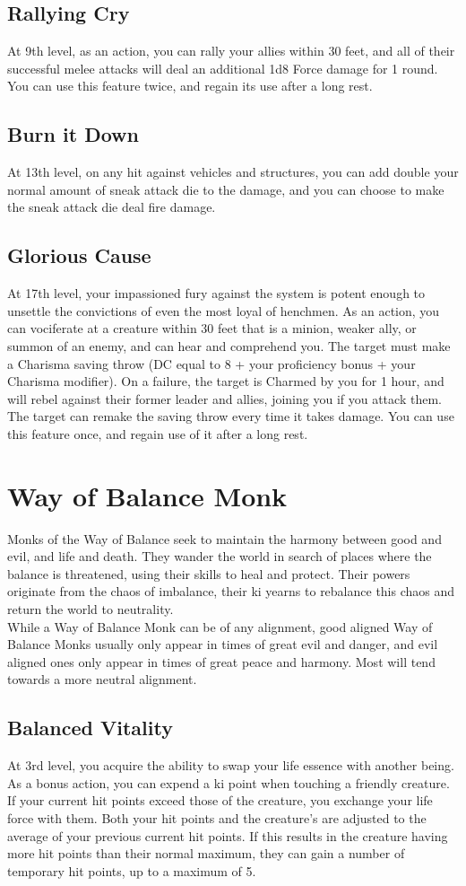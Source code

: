 \subsection{Rallying Cry}
At 9th level, as an action, you can rally your allies within 30 feet, and all of their successful melee attacks will deal an additional 1d8 Force damage for 1 round. You can use this feature twice, and regain its use after a long rest.
\subsection{Burn it Down}
At 13th level, on any hit against vehicles and structures, you can add double your normal amount of sneak attack die to the damage, and you can choose to make the sneak attack die deal fire damage. 
\subsection{Glorious Cause}
At 17th level, your impassioned fury against the system is potent enough to unsettle the convictions of even the most loyal of henchmen. As an action, you can vociferate at a creature within 30 feet that is a minion, weaker ally, or summon of an enemy, and can hear and comprehend you. The target must make a Charisma saving throw (DC equal to 8 + your proficiency bonus + your Charisma modifier). On a failure, the target is Charmed by you for 1 hour, and will rebel against their former leader and allies, joining you if you attack them. The target can remake the saving throw every time it takes damage. You can use this feature once, and regain use of it after a long rest.
\section{Way of Balance Monk}\label{Balance}
Monks of the Way of Balance seek to maintain the harmony between good and evil, and life and death. They wander the world in search of places where the balance is threatened, using their skills to heal and protect. Their powers originate from the chaos of imbalance, their ki yearns to rebalance this chaos and return the world to neutrality.\\
While a Way of Balance Monk can be of any alignment, good aligned Way of Balance Monks usually only appear in times of great evil and danger, and evil aligned ones only appear in times of great peace and harmony. Most will tend towards a more neutral alignment.

\subsection{Balanced Vitality}
At 3rd level, you acquire the ability to swap your life essence with another being. As a bonus action, you can expend a ki point when touching a friendly creature. If your current hit points exceed those of the creature, you exchange your life force with them. Both your hit points and the creature's are adjusted to the average of your previous current hit points. If this results in the creature having more hit points than their normal maximum, they can gain a number of temporary hit points, up to a maximum of 5.

